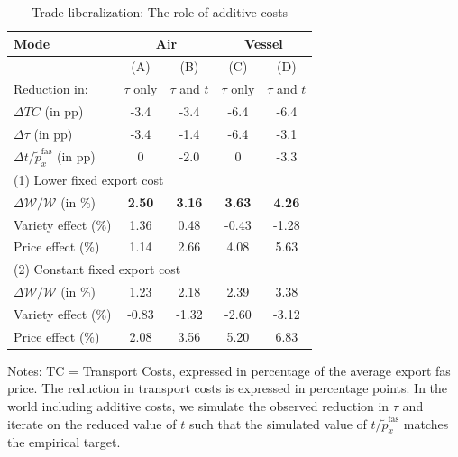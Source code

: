 \documentclass[a4paper,11pt]{article}
\begin{document}
\begin{table}[htbp]
  \centering
  \caption{Trade liberalization: The role of additive costs} \label{tab:resultats_modele}
\begin{center}
\begin{tabular}{l||c|c||c|c}
\hline
Mode & \multicolumn{2}{|c||}{Air} & \multicolumn{2}{c}{Vessel} \\ \hline
& (A) & (B) & (C) & (D)  \\
Reduction in: & $\tau$ only & $\tau$ and $t$ &$\tau$ only & $\tau$ and $t$\\  \hline
$\Delta TC$ (in pp) &-3.4 &-3.4 &-6.4 &-6.4   \\
$\Delta \tau$ (in pp) & -3.4	&-1.4&-6.4&	-3.1	 \\
$\Delta t/\widetilde{p}_x^{\text{fas}}$ (in pp) & 0&	-2.0&	0&	-3.3 \\ \hline \hline
\multicolumn{4}{l}{(1) Lower fixed export cost} \\ \hline
$\Delta \mathcal{W}/\mathcal{W}$ (in \%) & 	\textbf{2.50}	&\textbf{3.16}	&	\textbf{3.63}&	\textbf{4.26 }  \\\hline
Variety effect (\%)&1.36 &0.48	&-0.43	&-1.28 \\
Price effect (\%)&	1.14 &	2.66&		 4.08&	5.63 \\ \hline \hline
\multicolumn{4}{l}{(2) Constant fixed export cost} \\ \hline
$\Delta \mathcal{W}/\mathcal{W}$ (in \%) & 1.23&	2.18 & 2.39	&3.38 	 \\ \hline
Variety effect (\%)& -0.83 	&-1.32	&-2.60	& -3.12 \\
Price effect (\%)&2.08 &3.56	&5.20	& 6.83  \\
\hline
\end{tabular}
\end{center}
{\parbox[l]{10cm}{ \vspace{4pt}\footnotesize{Notes: TC = Transport Costs, expressed in percentage of the average export fas price. The reduction in transport costs is expressed in percentage points. In the world including additive costs, we simulate the observed reduction in $\tau$ and iterate on the reduced value of $t$ such that the simulated value of $t/\widetilde{p}_x^{\text{fas}}$ matches the empirical target.  }}}
\end{table}
\end{document}
